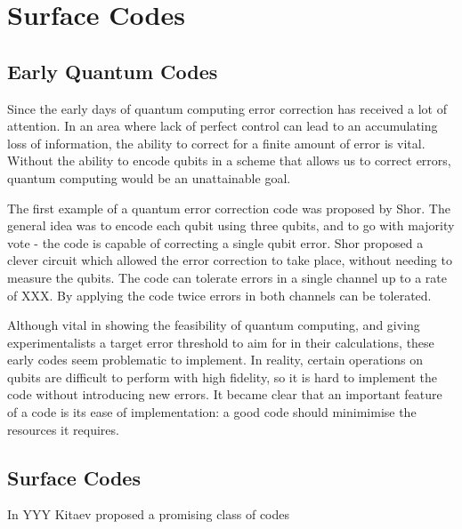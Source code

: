 \chapter{Surface Codes} 
\label{ch:SurfaceCodes}

\section{Early Quantum Codes}

Since the early days of quantum computing error correction has received a lot of attention. In an area where lack of perfect control can lead to an accumulating loss of information, the ability to correct for a finite amount of error is vital. Without the ability to encode qubits in a scheme that allows us to correct errors, quantum computing would be an unattainable goal.

The first example of a quantum error correction code was proposed by Shor. The general idea was to encode each qubit using three qubits, and to go with majority vote - the code is capable of correcting a single qubit error. Shor proposed a clever circuit which allowed the error correction to take place, without needing to measure the qubits. The code can tolerate errors in a single channel up to a rate of XXX. By applying the code twice errors in both channels can be tolerated.

Although vital in showing the feasibility of quantum computing, and giving experimentalists a target error threshold to aim for in their calculations, these early codes seem problematic to implement. In reality, certain operations on qubits are difficult to perform with high fidelity, so it is hard to implement the code without introducing new errors. It became clear that an important feature of a code is its ease of implementation: a good code should minimimise the resources it requires.

\section{Surface Codes}

In YYY Kitaev proposed a promising class of codes

